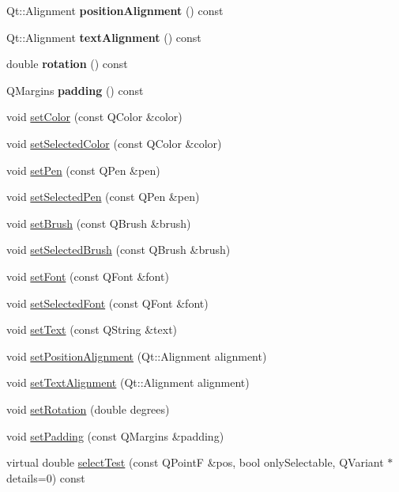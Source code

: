 \begin{DoxyCompactItemize}
Qt\+::\+Alignment {\bfseries position\+Alignment} () const
\item 
\hypertarget{class_q_c_p_item_text_a9af3198d46551e1cc7703f02c95ddfe5}{}\label{class_q_c_p_item_text_a9af3198d46551e1cc7703f02c95ddfe5} 
Qt\+::\+Alignment {\bfseries text\+Alignment} () const
\item 
\hypertarget{class_q_c_p_item_text_a035962b4ed23ff0a89e6a8b46fa18bf1}{}\label{class_q_c_p_item_text_a035962b4ed23ff0a89e6a8b46fa18bf1} 
double {\bfseries rotation} () const
\item 
\hypertarget{class_q_c_p_item_text_a5a598618350b40446d031fa9dc15fba7}{}\label{class_q_c_p_item_text_a5a598618350b40446d031fa9dc15fba7} 
Q\+Margins {\bfseries padding} () const
\item 
void \hyperlink{class_q_c_p_item_text_aa51efc0841fe52da9eaf8aff6fc8a8b2}{set\+Color} (const Q\+Color \&color)
\item 
void \hyperlink{class_q_c_p_item_text_ae7ba0bdb75c897b028388e45bfd435fa}{set\+Selected\+Color} (const Q\+Color \&color)
\item 
void \hyperlink{class_q_c_p_item_text_a9b9ec6eea0eb0603977ff84d4c78d0a3}{set\+Pen} (const Q\+Pen \&pen)
\item 
void \hyperlink{class_q_c_p_item_text_a291febe586f0da3f1c392e77bef4aa20}{set\+Selected\+Pen} (const Q\+Pen \&pen)
\item 
void \hyperlink{class_q_c_p_item_text_a1c7e131516df2ed8d941ef31240ded8e}{set\+Brush} (const Q\+Brush \&brush)
\item 
void \hyperlink{class_q_c_p_item_text_a6b8377eeb2af75eb9528422671ac16cb}{set\+Selected\+Brush} (const Q\+Brush \&brush)
\item 
void \hyperlink{class_q_c_p_item_text_a94ad60ebe04f5c07c35e7c2029e96b1f}{set\+Font} (const Q\+Font \&font)
\item 
void \hyperlink{class_q_c_p_item_text_a0be2841772f83663c4db307928b82816}{set\+Selected\+Font} (const Q\+Font \&font)
\item 
void \hyperlink{class_q_c_p_item_text_a3dacdda0ac88f99a05b333b977c48747}{set\+Text} (const Q\+String \&text)
\item 
void \hyperlink{class_q_c_p_item_text_a781cdf8c640fc6a055dcff1e675c8c7a}{set\+Position\+Alignment} (Qt\+::\+Alignment alignment)
\item 
void \hyperlink{class_q_c_p_item_text_ab5bc0684c4d1bed81949a11b34dba478}{set\+Text\+Alignment} (Qt\+::\+Alignment alignment)
\item 
void \hyperlink{class_q_c_p_item_text_a4bcc10cd97952c3f749d75824b5077f0}{set\+Rotation} (double degrees)
\item 
void \hyperlink{class_q_c_p_item_text_aeea8a3e01f135f9dd0bb08f51db66310}{set\+Padding} (const Q\+Margins \&padding)
\item 
virtual double \hyperlink{class_q_c_p_item_text_aca74494fd5e769f331a6eb3e29f32916}{select\+Test} (const Q\+PointF \&pos, bool only\+Selectable, Q\+Variant $\ast$details=0) const
\end{DoxyCompactItemize}
